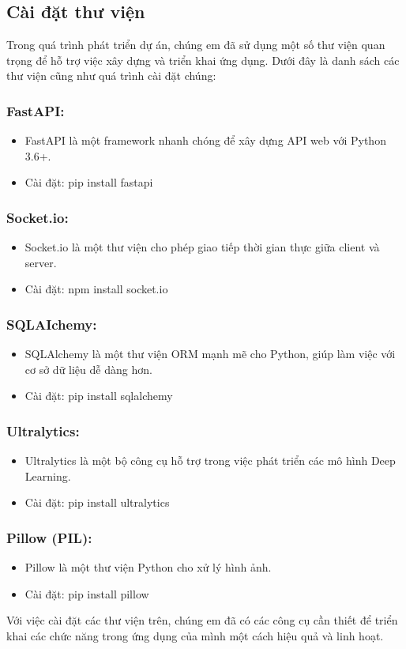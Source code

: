 \documentclass[a4paper]{article}
\begin{document}
\subsection{Cài đặt thư viện}
Trong quá trình phát triển dự án, chúng em đã sử dụng một số thư viện quan trọng để hỗ trợ việc xây dựng và triển khai ứng dụng. Dưới đây là danh sách các thư viện cũng như quá trình cài đặt chúng:
\subsubsection{FastAPI:}
\begin{itemize}
    \item FastAPI là một framework nhanh chóng để xây dựng API web với Python 3.6+.
    \item Cài đặt: pip install fastapi
\end{itemize}
\subsubsection{Socket.io:}
\begin{itemize}
    \item Socket.io là một thư viện cho phép giao tiếp thời gian thực giữa client và server.
    \item Cài đặt: npm install socket.io
\end{itemize}
\subsubsection{SQLAIchemy:}
\begin{itemize}
    \item SQLAlchemy là một thư viện ORM mạnh mẽ cho Python, giúp làm việc với cơ sở dữ liệu dễ dàng hơn.
    \item Cài đặt: pip install sqlalchemy
\end{itemize}
\subsubsection{Ultralytics:}
\begin{itemize}
    \item Ultralytics là một bộ công cụ hỗ trợ trong việc phát triển các mô hình Deep Learning.
    \item Cài đặt: pip install ultralytics
\end{itemize}
\subsubsection{Pillow (PIL):}
\begin{itemize}
    \item Pillow là một thư viện Python cho xử lý hình ảnh.
    \item Cài đặt: pip install pillow
\end{itemize}
Với việc cài đặt các thư viện trên, chúng em đã có các công cụ cần thiết để triển khai các chức năng trong ứng dụng của mình một cách hiệu quả và linh hoạt.
\end{document}
